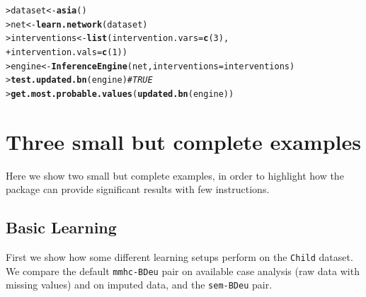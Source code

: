 \documentclass{article}\usepackage[]{graphicx}\usepackage[]{color}
\makeatletter
\newcommand{\hlnum}[1]{\textcolor[rgb]{0.686,0.059,0.569}{#1}}%
\newcommand{\hlcom}[1]{\textcolor[rgb]{0.678,0.584,0.686}{\textit{#1}}}%
\newcommand{\hlstd}[1]{\textcolor[rgb]{0.345,0.345,0.345}{#1}}%
\newcommand{\hlkwb}[1]{\textcolor[rgb]{0.69,0.353,0.396}{#1}}%
\newcommand{\hlkwc}[1]{\textcolor[rgb]{0.333,0.667,0.333}{#1}}%
\newcommand{\hlkwd}[1]{\textcolor[rgb]{0.737,0.353,0.396}{\textbf{#1}}}%
\newenvironment{kframe}{%
 \def\at@end@of@kframe{}%
 \ifinner\ifhmode%
  \def\at@end@of@kframe{\end{minipage}}%
  \begin{minipage}{\columnwidth}%
 \fi\fi%
 \def\FrameCommand##1{\hskip\@totalleftmargin \hskip-\fboxsep
 \colorbox{shadecolor}{##1}\hskip-\fboxsep
     \hskip-\linewidth \hskip-\@totalleftmargin \hskip\columnwidth}%
 \MakeFramed {\advance\hsize-\width
   \@totalleftmargin\z@ \linewidth\hsize
   \@setminipage}}%
 {\par\unskip\endMakeFramed%
 \at@end@of@kframe}
\newenvironment{knitrout}{}{} %
\makeatother
\begin{document}
\begin{knitrout}
\color{fgcolor}\begin{kframe}
\begin{alltt}
\hlstd{> }\hlstd{dataset}       \hlkwb{<-} \hlkwd{asia}\hlstd{()}
\hlstd{> }\hlstd{net}           \hlkwb{<-} \hlkwd{learn.network}\hlstd{(dataset)}
\hlstd{> }\hlstd{interventions} \hlkwb{<-} \hlkwd{list}\hlstd{(}\hlkwc{intervention.vars}\hlstd{=}\hlkwd{c}\hlstd{(}\hlnum{3}\hlstd{),}
\hlstd{+ }                      \hlkwc{intervention.vals}\hlstd{=}\hlkwd{c}\hlstd{(}\hlnum{1}\hlstd{))}
\hlstd{> }\hlstd{engine}        \hlkwb{<-} \hlkwd{InferenceEngine}\hlstd{(net,} \hlkwc{interventions} \hlstd{= interventions)}
\hlstd{> }\hlkwd{test.updated.bn}\hlstd{(engine)} \hlcom{# TRUE}
\hlstd{> }\hlkwd{get.most.probable.values}\hlstd{(}\hlkwd{updated.bn}\hlstd{(engine))}
\end{alltt}
\end{kframe}
\end{knitrout}


\section{Three small but complete examples}
Here we show two small but complete examples, in order to highlight how the package can provide significant results
with few instructions.


\subsection{Basic Learning}
First we show how some different learning setups perform on the \texttt{Child} dataset. We compare the default
\texttt{mmhc-BDeu} pair on available case analysis (raw data with missing values) and on imputed data, and
the \texttt{sem-BDeu} pair.
\end{document}
